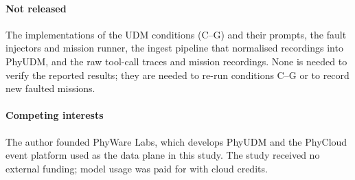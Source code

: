 \documentclass[conference]{IEEEtran}
\newcommand{\udm}{PhyUDM}
\newcommand{\condC}{C}
\newcommand{\condG}{G}
\begin{document}
\paragraph{Not released} The implementations of the UDM conditions
(\condC--\condG) and their prompts, the fault injectors and mission runner, the
ingest pipeline that normalised recordings into \udm{}, and the raw tool-call
traces and mission recordings. None is needed to verify the reported results;
they are needed to re-run conditions \condC--\condG{} or to record new faulted
missions.

\paragraph{Competing interests} The author founded PhyWare Labs, which develops
\udm{} and the PhyCloud event platform used as the data plane in this study. The
study received no external funding; model usage was paid for with cloud credits.

\balance


\end{document}
